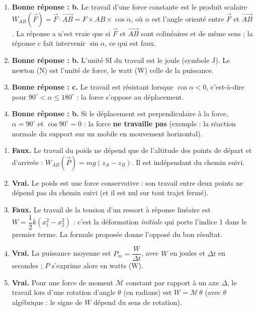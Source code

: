 \documentclass[11pt]{article}
\newcommand{\cle}[1]{{\popxbold\color{popdark}#1}}
\begin{document}
\begin{corrige}
\begin{enumerate}
\item \textbf{Bonne réponse : b.} Le travail d'une force constante est le produit scalaire $W_{AB}(\vec{F}) = \vec{F}\cdot\overrightarrow{AB} = F\times AB\times\cos\alpha$, où $\alpha$ est l'angle orienté entre $\vec{F}$ et $\overrightarrow{AB}$. La réponse a n'est vraie que si $\vec{F}$ et $\overrightarrow{AB}$ sont colinéaires et de même sens ; la réponse c fait intervenir $\sin\alpha$, ce qui est faux.
\item \textbf{Bonne réponse : b.} L'unité SI du travail est le \cle{joule} (symbole J). Le newton (N) est l'unité de force, le watt (W) celle de la puissance.
\item \textbf{Bonne réponse : c.} Le travail est résistant lorsque $\cos\alpha < 0$, c'est-à-dire pour $90^{\circ} < \alpha \leq 180^{\circ}$ : la force s'oppose au déplacement.
\item \textbf{Bonne réponse : b.} Si le déplacement est perpendiculaire à la force, $\alpha = 90^{\circ}$ et $\cos 90^{\circ} = 0$ : la force \textbf{ne travaille pas} (exemple : la réaction normale du support sur un mobile en mouvement horizontal).
\end{enumerate}
\end{corrige}

\begin{corrige}
\begin{enumerate}
\item \textbf{Faux.} Le travail du poids ne dépend que de l'altitude des points de départ et d'arrivée : $W_{AB}(\vec{P}) = mg(z_A - z_B)$. Il est indépendant du chemin suivi.
\item \textbf{Vrai.} Le poids est une force conservative : son travail entre deux points ne dépend pas du chemin suivi (et il est nul sur tout trajet fermé).
\item \textbf{Faux.} Le travail de la tension d'un ressort à réponse linéaire est $W = \dfrac{1}{2}k\left(x_1^2 - x_2^2\right)$ : c'est la déformation \emph{initiale} qui porte l'indice 1 dans le premier terme. La formule proposée donne l'opposé du bon résultat.
\item \textbf{Vrai.} La puissance moyenne est $P_m = \dfrac{W}{\Delta t}$, avec $W$ en joules et $\Delta t$ en secondes ; $P$ s'exprime alors en watts (W).
\item \textbf{Vrai.} Pour une force de moment $\mathcal{M}$ constant par rapport à un axe $\Delta$, le travail lors d'une rotation d'angle $\theta$ (en radians) est $W = \mathcal{M}\,\theta$ (avec $\theta$ algébrique : le signe de $W$ dépend du sens de rotation).
\end{enumerate}
\end{corrige}
\end{document}
